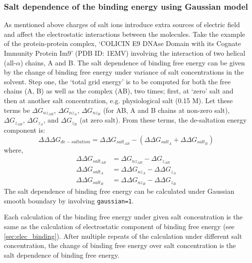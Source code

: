 \documentclass[9pt,tutorial]{livecoms}
\begin{document}
\subsubsection{Salt dependence of the binding energy using Gaussian model} \label{sec:salt-dependence-of-the-binding-energy-using-Gaussian-model}
As mentioned above charges of salt ions introduce extra sources of electric field and affect the electrostatic interactions between the molecules.  Take the example of the protein-protein complex, `COLICIN E9 DNAse Domain with its Cognate Immunity Protein Im9' (PDB ID: 1EMV) involving the interaction of two helical (all-$ \alpha $) chains, A and B. The salt dependence of binding free energy can be given by the change of binding free energy under variance of salt concentrations in the solvent. Step one, the ‘total grid energy’ is to be computed for both the free chains (A, B) as well as the complex (AB), two times; first, at `zero' salt and then at another salt concentration, e.g. physiological salt (0.15 M). Let these terms be $ \Delta G_{nz_{AB}}$, $ \Delta G_{nz_A}$, $ \Delta G_{nz_B}$ (for AB, A and B chains at non-zero salt), $ \Delta G_{z_{AB}}$, $ \Delta G_{z_A} $, and $ \Delta G_{z_B}$ (at zero salt). From these terms, the de-saltation energy component is:
\begin{equation}
 \Delta\Delta\Delta G_{de-saltation}= \Delta\Delta G_{salt_{AB}}  - \left( \Delta\Delta G_{salt_A}  + \Delta\Delta G_{salt_B} \right)
\end{equation}
where,
\begin{equation}
\begin{aligned}
\Delta\Delta G_{salt_{AB}}  &= \Delta G_{nz_{AB}}  - \Delta G_{z_{AB}}
\nonumber \\
\Delta\Delta G_{salt_A}  &= \Delta\Delta G_{nz_A}  - \Delta\Delta G_{z_A} \nonumber \\
\Delta\Delta G_{salt_B}  &= \Delta\Delta G_{nz_B}  - \Delta\Delta G_{z_B} \nonumber
\end{aligned}
\end{equation}
The salt dependence of binding free energy can be calculated under Gaussian smooth boundary by involving \texttt{gaussian=1}\cite{jia2017treating}. 

Each calculation of the binding free energy under given salt concentration is the same as the calculation of electrostatic component of binding free energy (see \ref{sec:elec_binding}). After multiple repeats of the calculation under different salt concentration, the change of binding free energy over salt concentration is the salt dependence of binding free energy.
\end{document}
